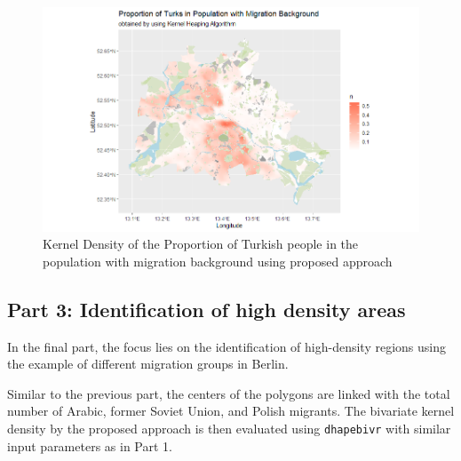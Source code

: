 \begin{figure}[h]
    \centering
    \includegraphics[scale = 0.55]{Figure/KH_Part2.png}
    \caption{Kernel Density of the Proportion of Turkish people in the population with migration background using proposed approach}
    \label{fig:turkMigrantsKDE}
\end{figure}

\hypertarget{Part-3-Identification-of-high-density-areas}{%
\subsection{Part 3: Identification of high density areas}\label{Part-3-Identification-of-high-density-areas}}


In the final part, the focus lies on the identification of high-density regions using the example of different migration groups in Berlin.

Similar to the previous part, the centers of the polygons are linked with the total number of Arabic, former Soviet Union, and Polish migrants. The bivariate kernel density by the proposed approach is then evaluated using \texttt{dhapebivr} with similar input parameters as in Part 1.

